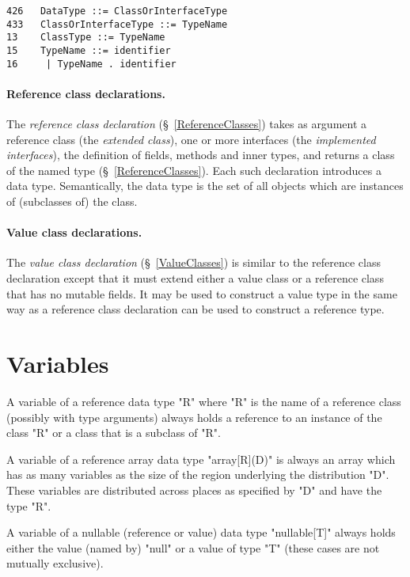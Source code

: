 \begin{verbatim}
426   DataType ::= ClassOrInterfaceType
433   ClassOrInterfaceType ::= TypeName 
13    ClassType ::= TypeName
15    TypeName ::= identifier
16     | TypeName . identifier
\end{verbatim}

\paragraph{Reference class declarations.}\label{ReferenceTypes}
The {\em reference class declaration} (\S~\ref{ReferenceClasses}) takes
as argument a reference class (the {\em extended class}), one or more
interfaces (the {\em implemented interfaces}), the definition of
fields, methods and inner types, and returns a class of the named type
(\S~\ref{ReferenceClasses}). Each such declaration introduces a data
type. Semantically, the data type is the set of all objects which are
instances of (subclasses of) the class.

\paragraph{Value class declarations.}
The {\em value class declaration} (\S~\ref{ValueClasses}) is
similar to the reference class declaration except that it must extend
either a value class or a reference class that has no mutable fields.
It may be used to construct a value type in the same way as a
reference class declaration can be used to construct a reference type.




\notfouro{}

\section{Variables}\label{XtenVariables}

A variable of a reference data type \xcd"R" where \xcd"R" is the name
of a reference class (possibly with type arguments) always holds a
reference to an instance of the class \xcd"R" or a class that is a
subclass of \xcd"R". 

A variable of a reference array data type \xcd"array[R](D)" is always an
array which has as many variables as the size of the region underlying
the distribution \xcd"D". These variables are distributed across
places as specified by \xcd"D" and have the type \xcd"R".

A variable of a nullable (reference or value) data type \xcd"nullable[T]"
always holds either the value (named by) \xcd"null" or a value of
type \xcd"T" (these cases are not mutually exclusive).

